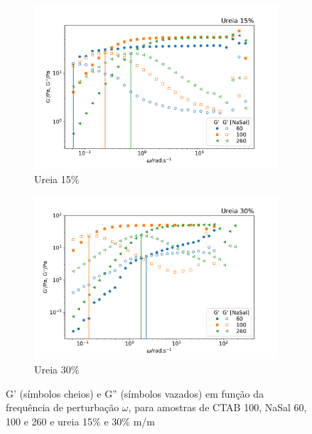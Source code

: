 	\begin{figure}[h]
	\begin{subfigure}[t]{0.5\textwidth}
		\centering
		\includegraphics[width=\textwidth]{imagens/reologia/oscilatorio_ur15p}
		\caption{Ureia 15\%}
		\label{fig:oscilatorio_ur_15p}
	\end{subfigure} %
	\begin{subfigure}[t]{0.5\textwidth}
		\centering
		\includegraphics[width=\textwidth]{imagens/reologia/oscilatorio_ur30p}
		\caption{Ureia 30\%}
		\label{fig:oscilatorio_ur_30p}
	\end{subfigure} %
	\caption{G' (símbolos cheios) e G'' (símbolos vazados) em função da frequência de perturbação \(\omega\), para amostras de CTAB 100\mM{}, NaSal 60, 100 e 260\mM{} e ureia 15\% e 30\% m/m}
	\label{fig:oscilatorio_ur}
	\end{figure}

